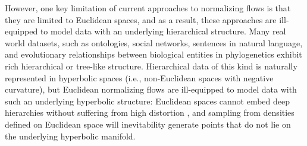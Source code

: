 However, one key limitation of current approaches to normalizing flows is that they are limited to Euclidean spaces, and as a result, these approaches are ill-equipped to model data with an underlying hierarchical structure. %
Many real world datasets, such as ontologies, social networks, sentences in natural language, and evolutionary relationships between biological entities in phylogenetics exhibit rich hierarchical or tree-like structure.
Hierarchical data of this kind is naturally represented in hyperbolic spaces (i.e., non-Euclidean spaces with negative curvature), but Euclidean normalizing flows are ill-equipped to model data with such an underlying hyperbolic structure: Euclidean spaces cannot embed deep hierarchies without suffering from high distortion \cite{sarkar2011low}, and sampling from densities defined on Euclidean space will inevitability generate points that do not lie on the underlying hyperbolic manifold. 


